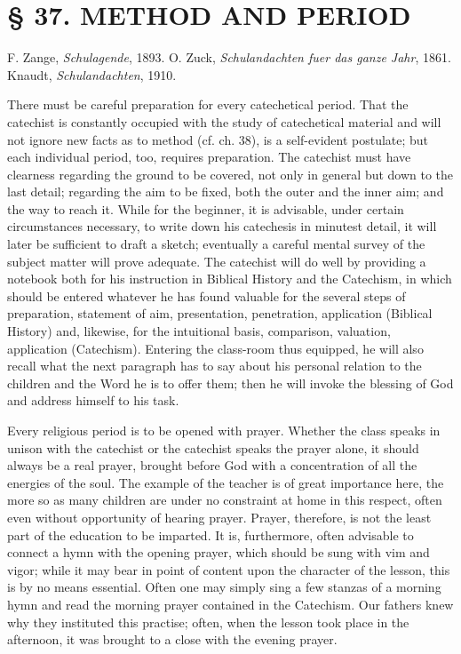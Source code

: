 \chapter{§ 37. METHOD AND PERIOD}

F. Zange, \emph{Schulagende}, 1893. O. Zuck, \emph{Schulandachten fuer das ganze Jahr}, 1861. Knaudt, \emph{Schulandachten}, 1910.

There must be careful preparation for every catechetical period. That the catechist is constantly occupied with the study of catechetical material and will not ignore new facts as to method (cf. ch. 38), is a self-evident postulate; but each individual period, too, requires preparation. The catechist must have clearness regarding the ground to be covered, not only in general but down to the last detail; regarding the aim to be fixed, both the outer and the inner aim; and the way to reach it. While for the beginner, it is advisable, under certain circumstances necessary, to write down his catechesis in minutest detail, it will later be sufficient to draft a sketch; eventually a careful mental survey of the subject matter will prove adequate. The catechist will do well by providing a notebook both for his instruction in Biblical History and the Catechism, in which should be entered whatever he has found valuable for the several steps of preparation, statement of aim, presentation, penetration, application (Biblical History) and, likewise, for the intuitional basis, comparison, valuation, application (Catechism). Entering the class-room thus equipped, he will also recall what the next paragraph has to say about his personal relation to the children and the Word he is to offer them; then he will invoke the blessing of God and address himself to his task.

Every religious period is to be opened with prayer. Whether the class speaks in unison with the catechist or the catechist speaks the prayer alone, it should always be a real prayer, brought before God with a concentration of all the energies of the soul. The example of the teacher is of
great importance here, the more so as many children are under no constraint at home in this respect, often even without opportunity of hearing prayer. Prayer, therefore, is not the least part of the education to be imparted. It is, furthermore, often advisable to connect a hymn with the opening prayer, which should be sung with vim and vigor; while it may bear in point of content upon the character of the lesson, this is by no means essential. Often one may simply sing a few stanzas of a morning hymn and read the morning prayer contained in the Catechism. Our fathers knew why they instituted this practise; often, when the lesson took place in the afternoon, it was brought to a close with the evening prayer.

